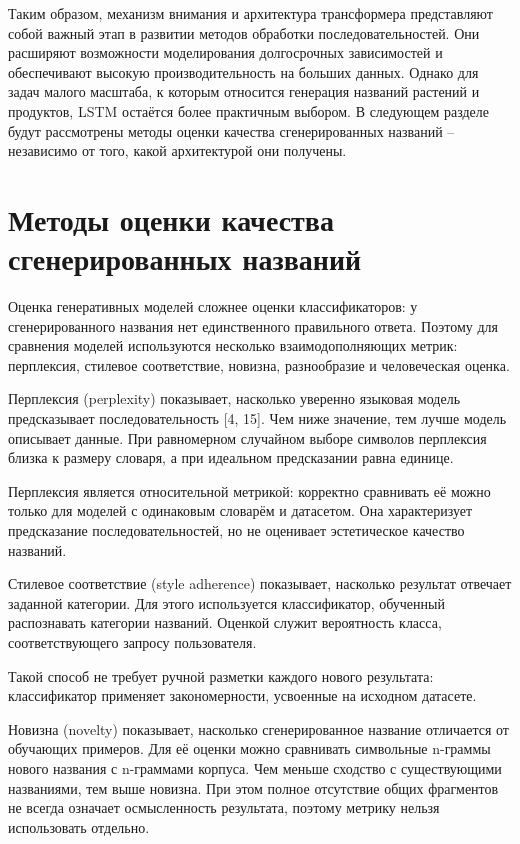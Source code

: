 Таким образом, механизм внимания и архитектура трансформера представляют собой важный этап в развитии методов обработки последовательностей. Они расширяют возможности моделирования долгосрочных зависимостей и обеспечивают высокую производительность на больших данных. Однако для задач малого масштаба, к которым относится генерация названий растений и продуктов, LSTM остаётся более практичным выбором. В следующем разделе будут рассмотрены методы оценки качества сгенерированных названий -- независимо от того, какой архитектурой они получены.

\section{Методы оценки качества сгенерированных названий}\label{ux43cux435ux442ux43eux434ux44b-ux43eux446ux435ux43dux43aux438-ux43aux430ux447ux435ux441ux442ux432ux430-ux441ux433ux435ux43dux435ux440ux438ux440ux43eux432ux430ux43dux43dux44bux445-ux43dux430ux437ux432ux430ux43dux438ux439}

Оценка генеративных моделей сложнее оценки классификаторов: у сгенерированного названия нет единственного правильного ответа. Поэтому для сравнения моделей используются несколько взаимодополняющих метрик: перплексия, стилевое соответствие, новизна, разнообразие и человеческая оценка.

Перплексия (perplexity) показывает, насколько уверенно языковая модель предсказывает последовательность {[}4, 15{]}. Чем ниже значение, тем лучше модель описывает данные. При равномерном случайном выборе символов перплексия близка к размеру словаря, а при идеальном предсказании равна единице.

Перплексия является относительной метрикой: корректно сравнивать её можно только для моделей с одинаковым словарём и датасетом. Она характеризует предсказание последовательностей, но не оценивает эстетическое качество названий.

Стилевое соответствие (style adherence) показывает, насколько результат отвечает заданной категории. Для этого используется классификатор, обученный распознавать категории названий. Оценкой служит вероятность класса, соответствующего запросу пользователя.

Такой способ не требует ручной разметки каждого нового результата: классификатор применяет закономерности, усвоенные на исходном датасете.

Новизна (novelty) показывает, насколько сгенерированное название отличается от обучающих примеров. Для её оценки можно сравнивать символьные n-граммы нового названия с n-граммами корпуса. Чем меньше сходство с существующими названиями, тем выше новизна. При этом полное отсутствие общих фрагментов не всегда означает осмысленность результата, поэтому метрику нельзя использовать отдельно.

